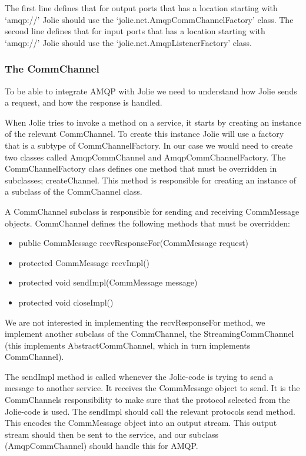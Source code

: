 The first line defines that for output ports that has a location starting with `amqp://' Jolie should use the `jolie.net.AmqpCommChannelFactory' class.
The second line defines that for input ports that has a location starting with `amqp://' Jolie should use the `jolie.net.AmqpListenerFactory' class.

\subsubsection{The CommChannel}
To be able to integrate AMQP with Jolie we need to understand how Jolie sends a request, and how the response is handled.

When Jolie tries to invoke a method on a service, it starts by creating an instance of the relevant CommChannel. To create this instance Jolie will use a factory that is a subtype of CommChannelFactory. In our case we would need to create two classes called AmqpCommChannel and AmqpCommChannelFactory. The CommChannelFactory class defines one method that must be overridden in subclasses; createChannel. This method is responsible for creating an instance of a subclass of the CommChannel class.

A CommChannel subclass is responsible for sending and receiving CommMessage objects. CommChannel defines the following methods that must be overridden:
\begin{itemize}
  \item public CommMessage recvResponseFor(CommMessage request)
  \item protected CommMessage recvImpl()
  \item protected void sendImpl(CommMessage message)
  \item protected void closeImpl()
\end{itemize}

We are not interested in implementing the recvResponseFor method, we implement another subclass of the CommChannel, the StreamingCommChannel (this implements AbstractCommChannel, which in turn implements CommChannel).

The sendImpl method is called whenever the Jolie-code is trying to send a message to another service. It receives the CommMessage object to send. It is the CommChannels responsibility to make sure that the protocol selected from the Jolie-code is used. The sendImpl should call the relevant protocols send method. This encodes the CommMessage object into an output stream. This output stream should then be sent to the service, and our subclass (AmqpCommChannel) should handle this for AMQP.

